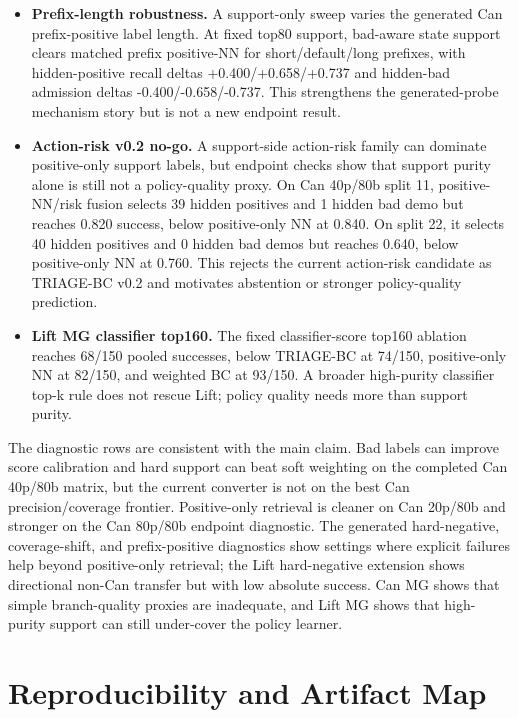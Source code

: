 \documentclass{article}
\newcommand{\method}{TRIAGE-BC}
\begin{document}
\begin{itemize}[leftmargin=*]
  \item \textbf{Prefix-length robustness.} A support-only sweep varies the generated Can prefix-positive label length. At fixed top80 support, bad-aware state support clears matched prefix positive-NN for short/default/long prefixes, with hidden-positive recall deltas +0.400/+0.658/+0.737 and hidden-bad admission deltas -0.400/-0.658/-0.737. This strengthens the generated-probe mechanism story but is not a new endpoint result.
  \item \textbf{Action-risk v0.2 no-go.} A support-side action-risk family can dominate positive-only support labels, but endpoint checks show that support purity alone is still not a policy-quality proxy. On Can 40p/80b split 11, positive-NN/risk fusion selects 39 hidden positives and 1 hidden bad demo but reaches 0.820 success, below positive-only NN at 0.840. On split 22, it selects 40 hidden positives and 0 hidden bad demos but reaches 0.640, below positive-only NN at 0.760. This rejects the current action-risk candidate as \method{} v0.2 and motivates abstention or stronger policy-quality prediction.
  \item \textbf{Lift MG classifier top160.} The fixed classifier-score top160 ablation reaches 68/150 pooled successes, below \method{} at 74/150, positive-only NN at 82/150, and weighted BC at 93/150. A broader high-purity classifier top-k rule does not rescue Lift; policy quality needs more than support purity.
\end{itemize}

The diagnostic rows are consistent with the main claim. Bad labels can improve score calibration and hard support can beat soft weighting on the completed Can 40p/80b matrix, but the current converter is not on the best Can precision/coverage frontier. Positive-only retrieval is cleaner on Can 20p/80b and stronger on the Can 80p/80b endpoint diagnostic. The generated hard-negative, coverage-shift, and prefix-positive diagnostics show settings where explicit failures help beyond positive-only retrieval; the Lift hard-negative extension shows directional non-Can transfer but with low absolute success. Can MG shows that simple branch-quality proxies are inadequate, and Lift MG shows that high-purity support can still under-cover the policy learner.

\section{Reproducibility and Artifact Map}
\end{document}
